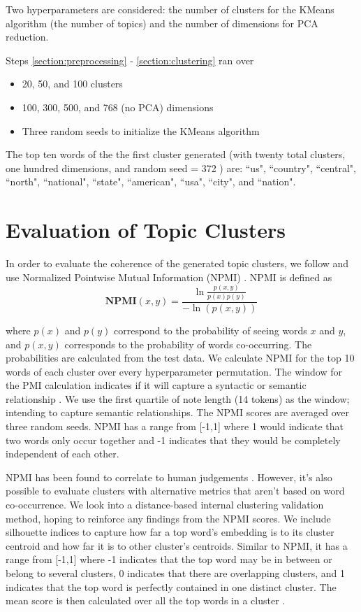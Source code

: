 \documentclass [11pt, proquest] {uwthesis}[2020/02/24]
\begin{document}
Two hyperparameters are considered: the number of clusters for the KMeans algorithm (the number of topics) and the number of dimensions for PCA reduction.

Steps \ref{section:preprocessing} - \ref{section:clustering} ran over
\begin{itemize}
  \item 20, 50, and 100 clusters
  \item 100, 300, 500, and 768 (no PCA) dimensions
  \item Three random seeds to initialize the KMeans algorithm
\end{itemize}

The top ten words of the the first cluster generated (with twenty total clusters, one hundred dimensions, and  random seed = 372 ) are: ``us", ``country", ``central", ``north", ``national", ``state", ``american", ``usa", ``city", and ``nation".

\chapter{Evaluation of Topic Clusters}

In order to evaluate the coherence of the generated topic clusters, we follow \cite{sia-etal-2020-tired} and use Normalized Pointwise Mutual Information (NPMI) \citep{bouma2009normalized}.   NPMI is defined as $$\textbf{NPMI}(x,y) = \frac{\ln\frac{p(x,y)}{p(x)p(y)}}{-\ln(p(x,y))}$$

where $p(x)$ and $p(y)$ correspond to the probability of seeing words $x$ and $y$, and $p(x,y)$ corresponds to the probability of words co-occurring. The probabilities are calculated from the test data. We calculate NPMI for  the top 10 words of each cluster over every hyperparameter permutation. The window for the PMI calculation indicates if it will capture a syntactic or semantic relationship \citep{jurafsky_martin_2019}. We use the first quartile of note length (14 tokens) as the window; intending to capture semantic relationships. The NPMI scores are averaged over three random seeds.  NPMI has a range from [-1,1] where 1 would indicate that two words only occur together and -1 indicates that they would be completely independent of each other.


NPMI has been found to correlate to human judgements \citep{lau2014machine}. However, it's also possible to evaluate clusters with alternative metrics that aren't based on word co-occurrence. We look into a distance-based internal clustering validation method, hoping to  reinforce any findings from the NPMI scores. We include silhouette indices \citep{liu2010understanding}  to capture how far a top word’s embedding is to its cluster centroid and how far it is to other cluster's centroids. Similar to NPMI, it has a range from [-1,1] where -1 indicates that the top word may be in between or belong to several clusters, 0 indicates that there are overlapping clusters, and 1 indicates that the top word is perfectly contained in one distinct cluster. The mean score is then calculated over all the top words in a cluster  \citep{scikit-learn}.
\end{document}

